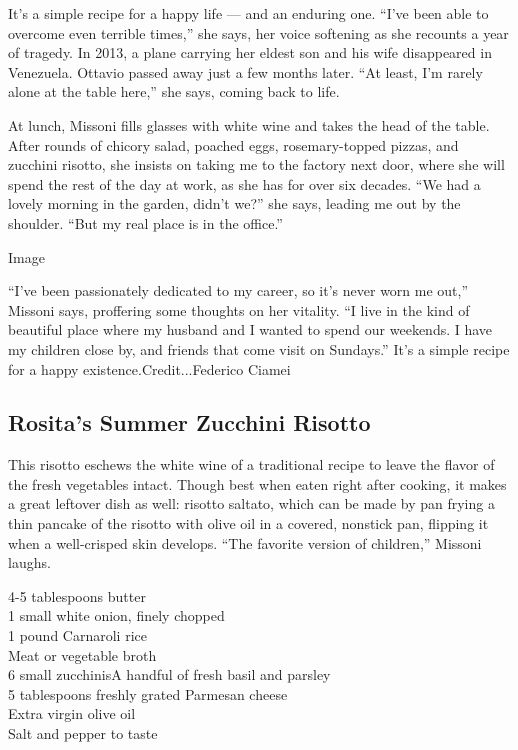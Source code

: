 It's a simple recipe for a happy life --- and an enduring one. ``I've
been able to overcome even terrible times,'' she says, her voice
softening as she recounts a year of tragedy. In 2013, a plane carrying
her eldest son and his wife disappeared in Venezuela. Ottavio passed
away just a few months later. ``At least, I'm rarely alone at the table
here,'' she says, coming back to life.

At lunch, Missoni fills glasses with white wine and takes the head of
the table. After rounds of chicory salad, poached eggs, rosemary-topped
pizzas, and zucchini risotto, she insists on taking me to the factory
next door, where she will spend the rest of the day at work, as she has
for over six decades. ``We had a lovely morning in the garden, didn't
we?'' she says, leading me out by the shoulder. ``But my real place is
in the office.''

Image

``I've been passionately dedicated to my career, so it's never worn me
out,'' Missoni says, proffering some thoughts on her vitality. ``I live
in the kind of beautiful place where my husband and I wanted to spend
our weekends. I have my children close by, and friends that come visit
on Sundays.'' It's a simple recipe for a happy
existence.Credit...Federico Ciamei

\hypertarget{rositas-summer-zucchini-risotto}{%
\subsection{\texorpdfstring{\textbf{Rosita's Summer Zucchini
Risotto}}{Rosita's Summer Zucchini Risotto}}\label{rositas-summer-zucchini-risotto}}

This risotto eschews the white wine of a traditional recipe to leave the
flavor of the fresh vegetables intact. Though best when eaten right
after cooking, it makes a great leftover dish as well: risotto saltato,
which can be made by pan frying a thin pancake of the risotto with olive
oil in a covered, nonstick pan, flipping it when a well-crisped skin
develops. ``The favorite version of children,'' Missoni laughs.

4-5 tablespoons butter\\
1 small white onion, finely chopped\\
1 pound Carnaroli rice\\
Meat or vegetable broth\\
6 small zucchinisA handful of fresh basil and parsley\\
5 tablespoons freshly grated Parmesan cheese\\
Extra virgin olive oil\\
Salt and pepper to taste

